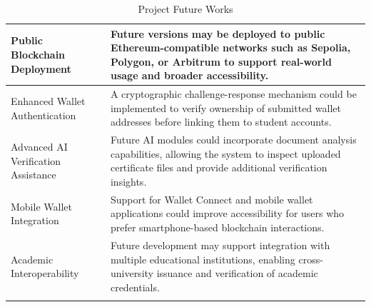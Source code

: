 \begin{longtable}{|m{3.5cm}|m{10.5cm}|}
    \hline
    
    Public Blockchain Deployment
    & Future versions may be deployed to public Ethereum-compatible networks such as Sepolia, Polygon, or Arbitrum to support real-world usage and broader accessibility.\\
    \hline

    Enhanced Wallet Authentication
    & A cryptographic challenge-response mechanism could be implemented to verify ownership of submitted wallet addresses before linking them to student accounts.\\
    \hline

    Advanced AI Verification Assistance
    & Future AI modules could incorporate document analysis capabilities, allowing the system to inspect uploaded certificate files and provide additional verification insights.\\
    \hline

    Mobile Wallet Integration
    & Support for Wallet Connect and mobile wallet applications could improve accessibility for users who prefer smartphone-based blockchain interactions.\\
    \hline

    Academic Interoperability
    & Future development may support integration with multiple educational institutions, enabling cross-university issuance and verification of academic credentials.\\
    \hline

    \caption{Project Future Works}
    \label{tab:project_future_works}
\end{longtable}